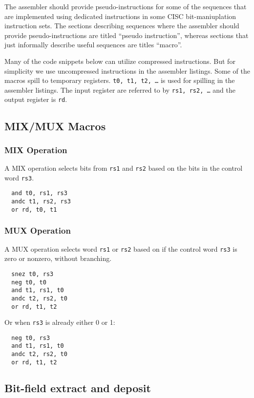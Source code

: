 The assembler should provide pseudo-instructions for some of the sequences that
are implemented using dedicated instructions in some CISC bit-maniuplation instruction
sets. The sections describing sequences where the assembler should provide pseudo-instructions
are titled ``pseudo instruction'', whereas sections that just informally describe useful
sequences are titles ``macro''.

Many of the code snippets below can utilize compressed instructions. But for simplicity
we use uncompressed instructions in the assembler listings. Some of the macros
spill to temporary registers. {\tt t0, t1, t2, \dots} is used for spilling in the
assembler listings. The input register are referred to by {\tt rs1, rs2, \dots} and
the output register is {\tt rd}.

\subsection{MIX/MUX Macros}

\subsubsection{MIX Operation}

A MIX operation selects bits from {\tt rs1} and {\tt rs2} based on the bits in
the control word {\tt rs3}.

\begin{verbatim}
  and t0, rs1, rs3
  andc t1, rs2, rs3
  or rd, t0, t1
\end{verbatim}

\subsubsection{MUX Operation}

A MUX operation selects word {\tt rs1} or {\tt rs2} based on if the control
word {\tt rs3} is zero or nonzero, without branching.

\begin{verbatim}
  snez t0, rs3
  neg t0, t0
  and t1, rs1, t0
  andc t2, rs2, t0
  or rd, t1, t2
\end{verbatim}

Or when {\tt rs3} is already either 0 or 1:

\begin{verbatim}
  neg t0, rs3
  and t1, rs1, t0
  andc t2, rs2, t0
  or rd, t1, t2
\end{verbatim}

\subsection{Bit-field extract and deposit}

